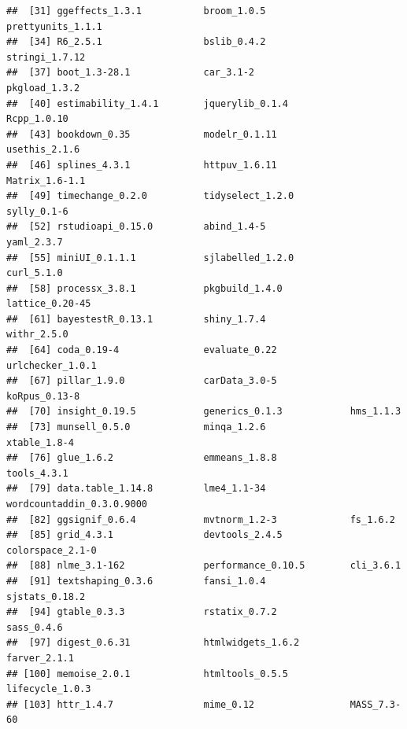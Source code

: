\documentclass[
  12pt,
  oneside]{book}
\theoremstyle{definition}
\theoremstyle{definition}
\theoremstyle{definition}
\theoremstyle{definition}
\theoremstyle{remark}
\begin{document}
\begin{verbatim}
##  [31] ggeffects_1.3.1           broom_1.0.5               prettyunits_1.1.1        
##  [34] R6_2.5.1                  bslib_0.4.2               stringi_1.7.12           
##  [37] boot_1.3-28.1             car_3.1-2                 pkgload_1.3.2            
##  [40] estimability_1.4.1        jquerylib_0.1.4           Rcpp_1.0.10              
##  [43] bookdown_0.35             modelr_0.1.11             usethis_2.1.6            
##  [46] splines_4.3.1             httpuv_1.6.11             Matrix_1.6-1.1           
##  [49] timechange_0.2.0          tidyselect_1.2.0          sylly_0.1-6              
##  [52] rstudioapi_0.15.0         abind_1.4-5               yaml_2.3.7               
##  [55] miniUI_0.1.1.1            sjlabelled_1.2.0          curl_5.1.0               
##  [58] processx_3.8.1            pkgbuild_1.4.0            lattice_0.20-45          
##  [61] bayestestR_0.13.1         shiny_1.7.4               withr_2.5.0              
##  [64] coda_0.19-4               evaluate_0.22             urlchecker_1.0.1         
##  [67] pillar_1.9.0              carData_3.0-5             koRpus_0.13-8            
##  [70] insight_0.19.5            generics_0.1.3            hms_1.1.3                
##  [73] munsell_0.5.0             minqa_1.2.6               xtable_1.8-4             
##  [76] glue_1.6.2                emmeans_1.8.8             tools_4.3.1              
##  [79] data.table_1.14.8         lme4_1.1-34               wordcountaddin_0.3.0.9000
##  [82] ggsignif_0.6.4            mvtnorm_1.2-3             fs_1.6.2                 
##  [85] grid_4.3.1                devtools_2.4.5            colorspace_2.1-0         
##  [88] nlme_3.1-162              performance_0.10.5        cli_3.6.1                
##  [91] textshaping_0.3.6         fansi_1.0.4               sjstats_0.18.2           
##  [94] gtable_0.3.3              rstatix_0.7.2             sass_0.4.6               
##  [97] digest_0.6.31             htmlwidgets_1.6.2         farver_2.1.1             
## [100] memoise_2.0.1             htmltools_0.5.5           lifecycle_1.0.3          
## [103] httr_1.4.7                mime_0.12                 MASS_7.3-60
\end{verbatim}

  
\end{document}
